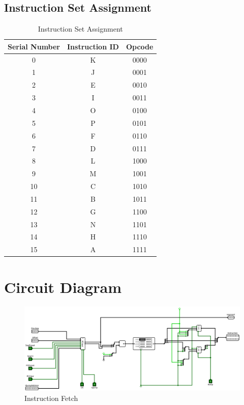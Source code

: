 \documentclass[12pt]{article}
\begin{document}
\subsection{Instruction Set Assignment}
\begin{table}[h]
    \centering
    \begin{tabular}{|c|c|c|}
    \hline
    Serial Number & Instruction ID & Opcode \\
    \hline
    0 & K & 0000 \\
    \hline
    1 & J & 0001 \\
    \hline
    2 & E & 0010 \\
    \hline
    3 & I & 0011 \\
    \hline
    4 & O & 0100 \\
    \hline
    5 & P & 0101 \\
    \hline
    6 & F & 0110 \\
    \hline
    7 & D & 0111 \\
    \hline
    8 & L & 1000 \\
    \hline
    9 & M & 1001 \\
    \hline
    10 & C & 1010 \\
    \hline
    11 & B & 1011 \\
    \hline
    12 & G & 1100 \\
    \hline
    13 & N & 1101 \\
    \hline
    14 & H & 1110 \\
    \hline
    15 & A & 1111 \\
    \hline
\end{tabular}

    \caption{Instruction Set Assignment}
\end{table}


\newpage
\section{\large{Circuit Diagram}}
\label{Circ}
\begin{figure}[H]
     \centering
     \includegraphics[width=\textwidth]{Images/Instruction Fetch.png}
     \caption{Instruction Fetch}
     \label{fig:if}
 \end{figure}
\end{document}
